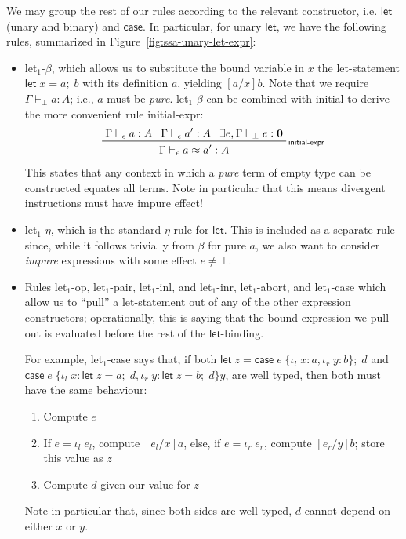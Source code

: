 \documentclass[acmsmall,screen,review]{acmart}
\newcommand{\mb}[1]{\ensuremath{\mathbf{#1}}}
\newcommand{\ms}[1]{\ensuremath{\mathsf{#1}}}
\newcommand{\lto}{:}
\newcommand{\linl}[1]{\iota_l\;{#1}}
\newcommand{\linr}[1]{\iota_r\;{#1}}
\newcommand{\letexpr}[3]{\ensuremath{\ms{let}\;#1 = #2;\;#3}}
\newcommand{\caseexpr}[5]{\ms{case}\;#1\;\{\linl{#2} \lto #3, \linr{#4} \lto #5\}}
\newcommand{\rle}[1]{{\scriptsize\textsf{#1}}}
\newcommand{\hasty}[4]{#1 \vdash_{#2} #3: {#4}}
\newcommand{\teqv}{\approx}
\newcommand{\tmeq}[5]{#1 \vdash_{#2} #3 \teqv #4 : {#5}}
\newcommand{\brle}[1]{{\textsf{#1}}}
\begin{document}
We may group the rest of our rules according to the relevant constructor, i.e. $\ms{let}$ (unary and
binary) and $\ms{case}$. In particular, for unary $\ms{let}$, we have the following rules,
summarized in Figure~\ref{fig:ssa-unary-let-expr}:
\begin{itemize}
  \item \brle{let$_1$-$\beta$}, which allows us to substitute the bound variable in $x$ the
  let-statement $\letexpr{x}{a}{b}$ with its definition $a$, yielding $[a/x]b$. Note that we require
  $\hasty{\Gamma}{\bot}{a}{A}$; i.e., $a$ must be \emph{pure}.
  \brle{let$_1$-$\beta$} can be combined with \brle{initial} to derive the more convenient
  rule \brle{initial-expr}:
  \begin{gather*}
    \prftree[r]{\rle{initial-expr}} 
      {\hasty{\Gamma}{\epsilon}{a}{A}}
      {\hasty{\Gamma}{\epsilon}{a'}{A}}
      {\exists e, \hasty{\Gamma}{\bot}{e}{\mb{0}}}
      {\tmeq{\Gamma}{\epsilon}{a}{a'}{A}}
  \end{gather*}
  This states that any context in which a \emph{pure} term of empty type can be constructed equates
  all terms. Note in particular that this means divergent instructions must have impure effect!

  \item \brle{let$_1$-$\eta$}, which is the standard $\eta$-rule for \ms{let}. This is included as a
  separate rule since, while it follows trivially from $\beta$ for pure $a$, we also want to
  consider \emph{impure} expressions with some effect $e \neq \bot$.
  
  \item Rules \brle{let$_1$-op}, \brle{let$_1$-pair}, \brle{let$_1$-inl}, and \brle{let$_1$-inr},
  \brle{let$_1$-abort}, and \brle{let$_1$-case} which allow us to ``pull'' a let-statement out of
  any of the other expression constructors; operationally, this is saying that the bound expression
  we pull out is evaluated before the rest of the \ms{let}-binding.
  
  For example, \brle{let$_1$-case} says that, if both
  $\letexpr{z}{\caseexpr{e}{x}{a}{y}{b}}{d}$ and
  $\caseexpr{e}{x}{\letexpr{z}{a}{d}}{y}{\letexpr{z}{b}{d}}{y}$,
  are well typed, then both must have the same behaviour:
  \begin{enumerate}
    \item Compute $e$
    \item If $e = \linl{e_l}$, compute $[e_l/x]a$, else, if $e = \linr{e_r}$, compute $[e_r/y]b$;
          store this value as $z$
    \item Compute $d$ given our value for $z$
  \end{enumerate}
  Note in particular that, since both sides are well-typed, $d$ cannot depend on either $x$ or $y$.
\end{itemize}
\end{document}
